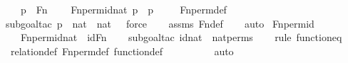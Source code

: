 \begin{isabellebody}
\ \ \ {\isachardoublequoteopen}p\ {\isasymin}\ Fn{\isachardoublequoteclose}\ \isanewline
\ \ \ {\isachardoublequoteopen}Fn{\isacharunderscore}{\kern0pt}perm{\isacharparenleft}{\kern0pt}id{\isacharparenleft}{\kern0pt}nat{\isacharparenright}{\kern0pt}{\isacharcomma}{\kern0pt}\ p{\isacharparenright}{\kern0pt}\ {\isacharequal}{\kern0pt}\ p{\isachardoublequoteclose}\ \isanewline
%
\isadelimproof
\ \ %
\endisadelimproof
%
\isatagproof
{}\isamarkupfalse%
\ Fn{\isacharunderscore}{\kern0pt}perm{\isacharunderscore}{\kern0pt}def\ \isanewline
\ \ \isamarkupfalse%
{\isacharparenleft}{\kern0pt}subgoal{\isacharunderscore}{\kern0pt}tac\ {\isachardoublequoteopen}p\ {\isasymsubseteq}\ {\isacharparenleft}{\kern0pt}nat\ {\isasymtimes}\ nat{\isacharparenright}{\kern0pt}\ {\isasymtimes}\ {}{\isachardoublequoteclose}{\isacharcomma}{\kern0pt}\ force{\isacharparenright}{\kern0pt}\isanewline
\ \ \isamarkupfalse%
\ assms\ Fn{\isacharunderscore}{\kern0pt}def\isanewline
\ \ \isamarkupfalse%
\ auto%
\endisatagproof
{\isafoldproof}%
%
\isadelimproof
\isanewline
%
\endisadelimproof
\isanewline
{}\isamarkupfalse%
\ Fn{\isacharunderscore}{\kern0pt}perm{\isacharprime}{\kern0pt}{\isacharunderscore}{\kern0pt}id\ {\isacharcolon}{\kern0pt}\ \isanewline
\ \ \ {\isachardoublequoteopen}Fn{\isacharunderscore}{\kern0pt}perm{\isacharprime}{\kern0pt}{\isacharparenleft}{\kern0pt}id{\isacharparenleft}{\kern0pt}nat{\isacharparenright}{\kern0pt}{\isacharparenright}{\kern0pt}\ {\isacharequal}{\kern0pt}\ id{\isacharparenleft}{\kern0pt}Fn{\isacharparenright}{\kern0pt}{\isachardoublequoteclose}\ \isanewline
%
\isadelimproof
\ \ %
\endisadelimproof
%
\isatagproof
{}\isamarkupfalse%
{\isacharparenleft}{\kern0pt}subgoal{\isacharunderscore}{\kern0pt}tac\ {\isachardoublequoteopen}id{\isacharparenleft}{\kern0pt}nat{\isacharparenright}{\kern0pt}\ {\isasymin}\ nat{\isacharunderscore}{\kern0pt}perms{\isachardoublequoteclose}{\isacharparenright}{\kern0pt}\isanewline
\ \ \ \isamarkupfalse%
{\isacharparenleft}{\kern0pt}rule\ function{\isacharunderscore}{\kern0pt}eq{\isacharparenright}{\kern0pt}\isanewline
\ \ \isamarkupfalse%
\ relation{\isacharunderscore}{\kern0pt}def\ Fn{\isacharunderscore}{\kern0pt}perm{\isacharprime}{\kern0pt}{\isacharunderscore}{\kern0pt}def\ function{\isacharunderscore}{\kern0pt}def\isanewline
\ \ \ \ \ \ \ \ \isamarkupfalse%
\ auto{\isacharbrackleft}{\kern0pt}{}{\isacharbrackright}{\kern0pt}\isanewline

\end{isabellebody}
